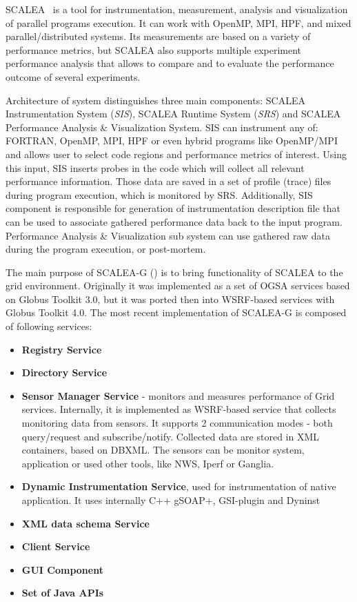 SCALEA~\cite{SCALEA1} is a tool for instrumentation, measurement, analysis and visualization of parallel programs execution. It can work with OpenMP, MPI, HPF, and mixed parallel/distributed systems. Its measurements are based on a variety of performance metrics, but SCALEA also supports multiple experiment performance analysis that allows to compare and to evaluate the performance outcome of several experiments.

Architecture of system distinguishes three main components: SCALEA Instrumentation System (\emph{SIS}), SCALEA Runtime System (\emph{SRS}) and SCALEA Performance Analysis \& Visualization System. SIS can instrument any of: FORTRAN, OpenMP, MPI, HPF or even hybrid programs like OpenMP/MPI and allows user to select code regions and performance metrics of interest. Using this input, SIS inserts probes in the code which will collect all relevant performance information. Those data are saved in a set of profile (trace) files during program execution, which is monitored by SRS. Additionally, SIS component is responsible for generation of instrumentation description file that can be used to associate gathered performance data back to the input program. Performance Analysis \& Visualization sub system can use gathered raw data during the program execution, or post-mortem.

The main purpose of SCALEA-G (\cite{SCALEA2, SCALEA3}) is to bring functionality of SCALEA to the grid environment. Originally it was implemented as a set of OGSA services based on Globus Toolkit 3.0, but it was ported then into WSRF-based services with Globus Toolkit 4.0. The most recent implementation of SCALEA-G is composed of following services:

\begin{itemize}
	\item{ {\bf Registry Service}}

	\item{ {\bf Directory Service}}

	\item{ {\bf Sensor Manager Service} - monitors and measures performance of Grid services. Internally, it is implemented as WSRF-based service that collects monitoring data from sensors. It supports 2 communication modes - both query/request and subscribe/notify. Collected data are stored in XML containers, based on DBXML. The sensors can be monitor system, application or used other tools, like NWS, Iperf or Ganglia.}

	\item{ {\bf Dynamic Instrumentation Service}, used for instrumentation of native application. It uses internally C++ gSOAP+, GSI-plugin and Dyninst}

	\item{ {\bf XML data schema Service}}

	\item{ {\bf Client Service}}

	\item{ {\bf GUI Component}}

	\item{ {\bf Set of Java APIs}}

\end{itemize}

